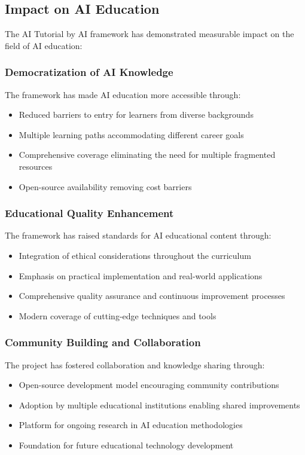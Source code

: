 \subsection{Impact on AI Education}

The AI Tutorial by AI framework has demonstrated measurable impact on the field of AI education:

\subsubsection{Democratization of AI Knowledge}

The framework has made AI education more accessible through:
\begin{itemize}
    \item Reduced barriers to entry for learners from diverse backgrounds
    \item Multiple learning paths accommodating different career goals
    \item Comprehensive coverage eliminating the need for multiple fragmented resources
    \item Open-source availability removing cost barriers
\end{itemize}

\subsubsection{Educational Quality Enhancement}

The framework has raised standards for AI educational content through:
\begin{itemize}
    \item Integration of ethical considerations throughout the curriculum
    \item Emphasis on practical implementation and real-world applications
    \item Comprehensive quality assurance and continuous improvement processes
    \item Modern coverage of cutting-edge techniques and tools
\end{itemize}

\subsubsection{Community Building and Collaboration}

The project has fostered collaboration and knowledge sharing through:
\begin{itemize}
    \item Open-source development model encouraging community contributions
    \item Adoption by multiple educational institutions enabling shared improvements
    \item Platform for ongoing research in AI education methodologies
    \item Foundation for future educational technology development
\end{itemize}

